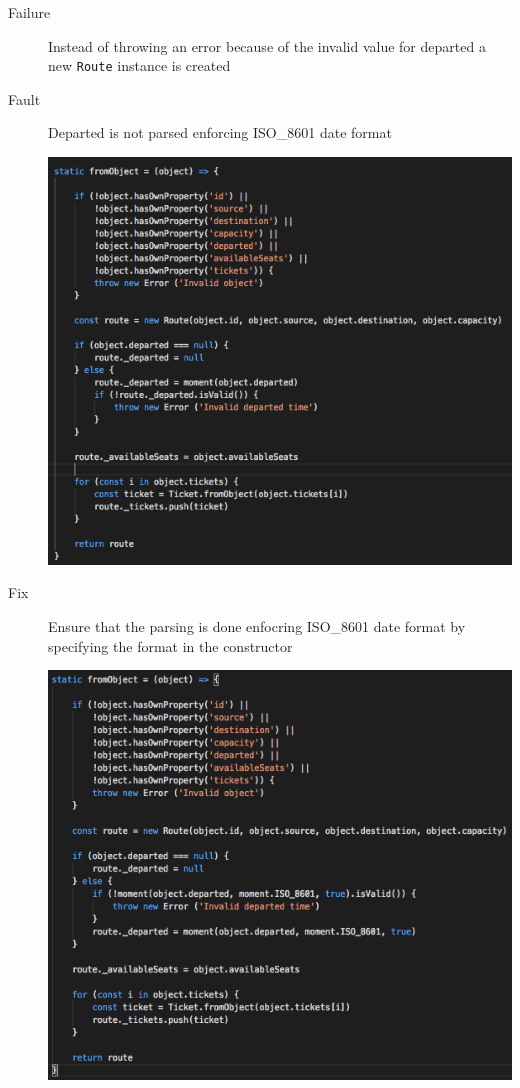 \documentclass[11pt]{article}
\begin{document}
\begin{description}
\item[{Failure}] Instead of throwing an error because of the invalid value for departed a new \texttt{Route} instance is created
\item[{Fault}] Departed is not parsed enforcing ISO\_8601 date format
\begin{center}
\includegraphics[width=.9\linewidth]{./Iteration2.rtfd/Pasted Graphic 8.tiff.png}
\end{center}
\item[{Fix}] Ensure that the parsing is done enfocring ISO\_8601 date format by specifying the format in the constructor
\begin{center}
\includegraphics[width=.9\linewidth]{./Iteration2.rtfd/Pasted Graphic 7.tiff.png}
\end{center}
\end{description}
\end{document}
